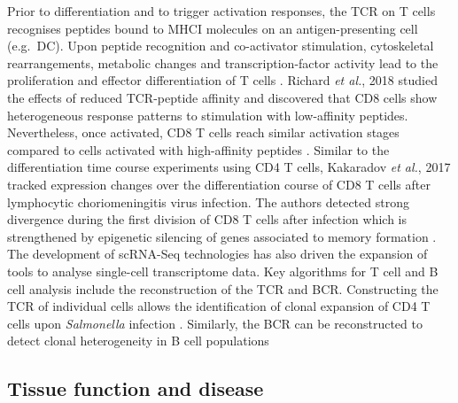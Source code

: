 Prior to differentiation and to trigger activation responses, the \gls{TCR} on T cells recognises peptides bound to \gls{MHCI} molecules on an antigen-presenting cell (e.g.~DC). Upon peptide recognition and co-activator stimulation, cytoskeletal rearrangements, metabolic changes and transcription-factor activity lead to the proliferation and effector differentiation of T cells \citep{Richard2018}. 
Richard \emph{et al.}, 2018 studied the effects of reduced TCR-peptide affinity and discovered that CD8\plus{} cells show heterogeneous response patterns to stimulation with low-affinity peptides. 
Nevertheless, once activated, CD8\plus{} T cells reach similar activation stages compared to cells activated with high-affinity peptides \citep{Richard2018}. 
Similar to the differentiation time course experiments using CD4\plus{} T cells, Kakaradov \emph{et al.}, 2017 tracked expression changes over the differentiation course of CD8\plus{} T cells after lymphocytic choriomeningitis virus infection. 
The authors detected strong divergence during the first division of CD8\plus{} T cells after infection which is strengthened by epigenetic silencing of genes associated to memory formation \citep{Kakaradov2017}.\\

The development of scRNA-Seq technologies has also driven the expansion of tools to analyse single-cell transcriptome data. 
Key algorithms for T cell and B cell analysis include the reconstruction of the TCR and \gls{BCR}. 
Constructing the TCR of individual cells allows the identification of clonal expansion of CD4\plus{} T cells upon \textit{Salmonella} infection \citep{Stubbington2016}. 
Similarly, the BCR can be reconstructed to detect clonal heterogeneity in B cell populations \citep{Canzar2017, Wu2018}

\subsection{Tissue function and disease}

